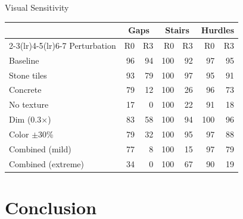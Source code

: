 \documentclass[aspectratio=169,10pt]{beamer}
\begin{document}
\begin{frame}{Visual Sensitivity}

\begin{center}
\small
\renewcommand{\arraystretch}{1.15}
\begin{tabular}{@{}l rr rr rr@{}}
  \toprule
  & \multicolumn{2}{c}{Gaps} & \multicolumn{2}{c}{Stairs}
  & \multicolumn{2}{c}{Hurdles} \\
  \cmidrule(lr){2-3}\cmidrule(lr){4-5}\cmidrule(lr){6-7}
  Perturbation        & R0   & R3   & R0   & R3   & R0   & R3   \\
  \midrule
  Baseline            & 96   & 94   & 100  & 92   & 97   & 95   \\
  \midrule
  Stone tiles         & 93   & 79   & 100  & 97   & 95   & 91   \\
  Concrete            & 79   & 12   & 100  & 26   & 96   & 73   \\
  No texture          & 17   &  0   & 100  & 22   & 91   & 18   \\
  \midrule
  Dim (0.3$\times$)   & 83   & 58   & 100  & 94   & 100  & 96   \\
  Color $\pm$30\%     & 79   & 32   & 100  & 95   & 97   & 88   \\
  \midrule
  Combined (mild)     & 77   &  8   & 100  & 15   & 97   & 79   \\
  Combined (extreme)  & 34   &  0   & 100  & 67   & 90   & 19   \\
  \bottomrule
\end{tabular}
\end{center}

\vspace{4pt}

\end{frame}


\section{Conclusion}
\end{document}
